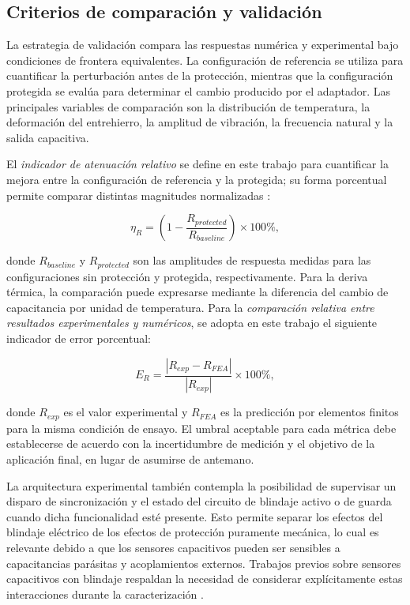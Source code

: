 \documentclass[conference]{IEEEtran}
\begin{document}
\subsection{Criterios de comparación y validación}

La estrategia de validación compara las respuestas numérica y experimental bajo condiciones de frontera equivalentes. La configuración de referencia se utiliza para cuantificar la perturbación antes de la protección, mientras que la configuración protegida se evalúa para determinar el cambio producido por el adaptador. Las principales variables de comparación son la distribución de temperatura, la deformación del entrehierro, la amplitud de vibración, la frecuencia natural y la salida capacitiva.

El \textit{indicador de atenuación relativo} se define en este trabajo para cuantificar la mejora entre la configuración de referencia y la protegida; su forma porcentual permite comparar distintas magnitudes normalizadas \cite{Schwenck2021}:

\begin{equation}
\eta_R=\left(1-\frac{R_{protected}}{R_{baseline}}\right)\times100\%,
\label{eq:attenuation}
\end{equation}

donde $R_{baseline}$ y $R_{protected}$ son las amplitudes de respuesta medidas para las configuraciones sin protección y protegida, respectivamente. Para la deriva térmica, la comparación puede expresarse mediante la diferencia del cambio de capacitancia por unidad de temperatura. Para la \textit{comparación relativa entre resultados experimentales y numéricos}, se adopta en este trabajo el siguiente indicador de error porcentual:

\begin{equation}
E_R=\frac{|R_{exp}-R_{FEA}|}{|R_{exp}|}\times100\%,
\label{eq:error}
\end{equation}

donde $R_{exp}$ es el valor experimental y $R_{FEA}$ es la predicción por elementos finitos para la misma condición de ensayo. El umbral aceptable para cada métrica debe establecerse de acuerdo con la incertidumbre de medición y el objetivo de la aplicación final, en lugar de asumirse de antemano.

La arquitectura experimental también contempla la posibilidad de supervisar un disparo de sincronización y el estado del circuito de blindaje activo o de guarda cuando dicha funcionalidad esté presente. Esto permite separar los efectos del blindaje eléctrico de los efectos de protección puramente mecánica, lo cual es relevante debido a que los sensores capacitivos pueden ser sensibles a capacitancias parásitas y acoplamientos externos. Trabajos previos sobre sensores capacitivos con blindaje respaldan la necesidad de considerar explícitamente estas interacciones durante la caracterización \cite{Aksoy2022,Ye2025}.
\end{document}

